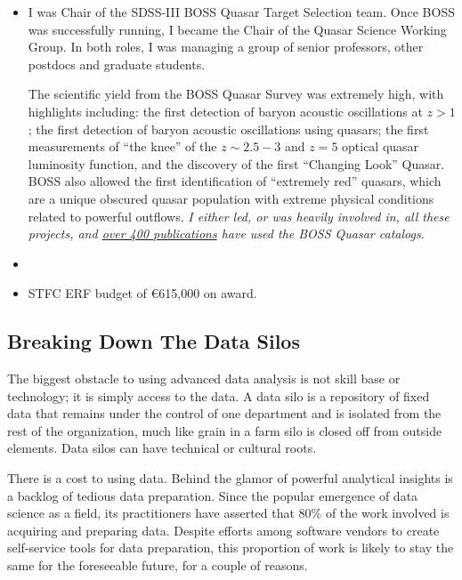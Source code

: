 \documentclass[oneside, a4paper, onecolumn, 11pt]{article}
\begin{document}
\begin{itemize}
\item I was Chair of the SDSS-III BOSS Quasar Target
Selection team. Once BOSS was successfully running, I became the Chair
of the Quasar Science Working Group. In both roles, I was managing a
group of senior professors, other postdocs and graduate students.

\noindent
The scientific yield from the BOSS Quasar Survey was extremely high,
with highlights including: the first detection of baryon acoustic
oscillations at $z>1$; the first detection of baryon acoustic
oscillations using quasars; the first measurements of ``the knee'' of
the $z\sim2.5-3$ and $z=5$ optical quasar luminosity function, and the
discovery of the first ``Changing Look'' Quasar.  BOSS also allowed
the first identification of ``extremely red'' quasars, which are a
unique obscured quasar population with extreme physical conditions
related to powerful outflows. {\it I either led, or was heavily
involved in, all these projects, and
\href{https://tinyurl.com/ycxd8lb6}{over 400 publications} have used
the BOSS Quasar catalogs}.

\item

\item STFC ERF budget of \euro615,000 on award. 

\end{itemize}

\subsection*{Breaking Down The Data Silos}
The biggest obstacle to using advanced data analysis is not skill base or technology; it is simply access to the data.
A data silo is a repository of fixed data that remains under the
control of one department and is isolated from the rest of the
organization, much like grain in a farm silo is closed off from
outside elements. Data silos can have technical or cultural roots.

\noindent
There is a cost to using data. Behind the glamor of powerful
analytical insights is a backlog of tedious data preparation. Since
the popular emergence of data science as a field, its practitioners
have asserted that 80\% of the work involved is acquiring and
preparing data. Despite efforts among software vendors to create
self-service tools for data preparation, this proportion of work is
likely to stay the same for the foreseeable future, for a couple of
reasons.
\end{document}
